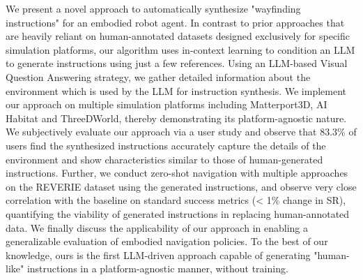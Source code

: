 We present a novel approach to automatically synthesize "wayfinding instructions" for an embodied robot agent. In contrast to prior approaches that are heavily reliant on human-annotated datasets designed exclusively for specific simulation platforms, our algorithm uses in-context learning to condition an LLM to generate instructions using just a few references. Using an LLM-based Visual Question Answering strategy, we gather detailed information about the environment which is used by the LLM for instruction synthesis. We implement our approach on multiple simulation platforms including Matterport3D, AI Habitat and ThreeDWorld, thereby demonstrating its platform-agnostic nature. We subjectively evaluate our approach via a user study and observe that 83.3\% of users find the synthesized instructions accurately capture the details of the environment and show characteristics similar to those of human-generated instructions. Further, we conduct zero-shot navigation with multiple approaches on the REVERIE dataset using the generated instructions, and observe very close correlation with the baseline on standard success metrics (\textless{} 1\% change in SR), quantifying the viability of generated instructions in replacing human-annotated data. We finally discuss the applicability of our approach in enabling a generalizable evaluation of embodied navigation policies. To the best of our knowledge, ours is the first LLM-driven approach capable of generating "human-like" instructions in a platform-agnostic manner, without training.